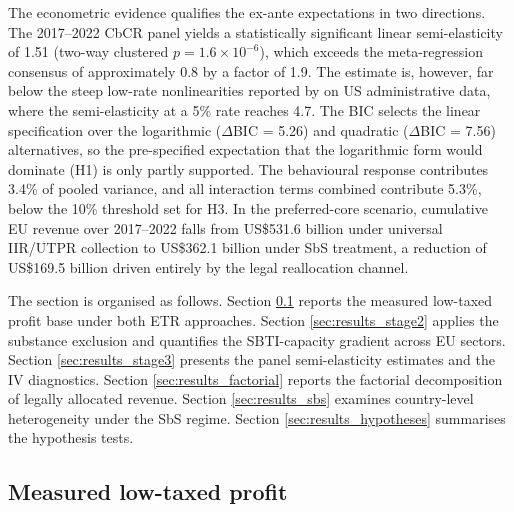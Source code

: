 \documentclass[11pt,a4paper]{article}
\begin{document}
The econometric evidence qualifies the ex-ante expectations in two directions. The 2017--2022 CbCR panel yields a statistically significant linear semi-elasticity of 1.51 (two-way clustered $p = 1.6 \times 10^{-6}$), which exceeds the meta-regression consensus of approximately 0.8 \citep{heckemeyer2017} by a factor of 1.9. The estimate is, however, far below the steep low-rate nonlinearities reported by \citet{dowd2017} on US administrative data, where the semi-elasticity at a 5\% rate reaches 4.7. The BIC selects the linear specification over the logarithmic ($\Delta$BIC = 5.26) and quadratic ($\Delta$BIC = 7.56) alternatives, so the pre-specified expectation that the logarithmic form would dominate (H1) is only partly supported. The behavioural response contributes 3.4\% of pooled variance, and all interaction terms combined contribute 5.3\%, below the 10\% threshold set for H3. In the preferred-core scenario, cumulative EU revenue over 2017--2022 falls from US\$531.6 billion under universal IIR/UTPR collection to US\$362.1 billion under SbS treatment, a reduction of US\$169.5 billion driven entirely by the legal reallocation channel.

The section is organised as follows. Section \ref{sec:results_stage1} reports the measured low-taxed profit base under both ETR approaches. Section \ref{sec:results_stage2} applies the substance exclusion and quantifies the SBTI-capacity gradient across EU sectors. Section \ref{sec:results_stage3} presents the panel semi-elasticity estimates and the IV diagnostics. Section \ref{sec:results_factorial} reports the factorial decomposition of legally allocated revenue. Section \ref{sec:results_sbs} examines country-level heterogeneity under the SbS regime. Section \ref{sec:results_hypotheses} summarises the hypothesis tests.

\subsection{Measured low-taxed profit}\label{sec:results_stage1}
\end{document}
